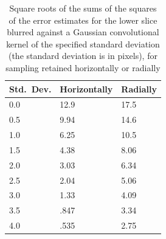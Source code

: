 \documentclass[article]{jdssv}
\begin{document}
\begin{table}

\vspace{.125in}

\caption{Square roots of the sums of the squares of the error estimates
for the lower slice blurred against a Gaussian convolutional kernel
of the specified standard deviation (the standard deviation is in pixels),
for sampling retained horizontally or radially}
\label{blurs3}
\begin{centering}

\vspace{.125in}

\begin{tabular}{lll}
\hline Std.\ Dev. & Horizontally & Radially \\\hline
       0.0 &         12.9 &     17.5 \\
       0.5 &         9.94 &     14.6 \\
       1.0 &         6.25 &     10.5 \\
       1.5 &         4.38 &     8.06 \\
       2.0 &         3.03 &     6.34 \\
       2.5 &         2.04 &     5.06 \\
       3.0 &         1.33 &     4.09 \\
       3.5 &         .847 &     3.34 \\
       4.0 &         .535 &     2.75 \\\hline
\end{tabular}

\end{centering}
\end{table}
\end{document}
